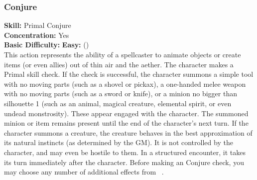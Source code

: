 \subsubsection{Conjure}
\textbf{Skill:} Primal Conjure\\
\textbf{Concentration:} Yes\\
\textbf{Basic Difficulty:} \textbf{Easy:} (\difficulty)\\
This action represents the ability of a spellcaster to animate objects or create
items (or even allies) out of thin air and the aether. The character makes a Primal
skill check. If the check is successful, the character summons a simple tool with
no moving parts (such as a shovel or pickax), a one-handed melee weapon with no moving
parts (such as a sword or knife), or a minion no bigger than silhouette 1 (such as an
animal, magical creature, elemental spirit, or even undead monstrosity). These appear
engaged with the character. The summoned minion or item remains present until the end
of the character's next turn. If the character summons a creature, the creature behaves
in the best approximation of its natural instincts (as determined by the GM). It
is not controlled by the character, and may even be hostile to them. In a structured
encounter, it takes its turn immediately after the character. Before making an
Conjure check, you may choose any number of additional effects from
~.
